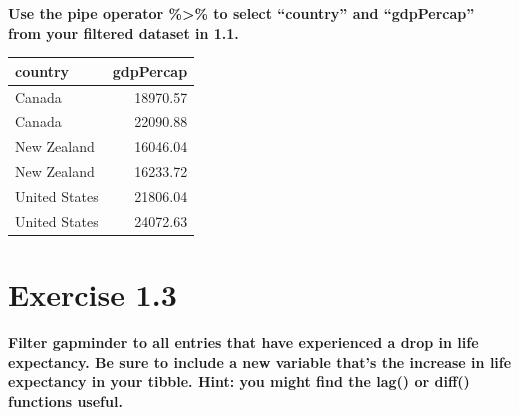 \documentclass[]{article}
\newenvironment{Shaded}{\begin{snugshade}}{\end{snugshade}}
\newcommand{\DataTypeTok}[1]{\textcolor[rgb]{0.13,0.29,0.53}{#1}}
\newcommand{\DecValTok}[1]{\textcolor[rgb]{0.00,0.00,0.81}{#1}}
\newcommand{\KeywordTok}[1]{\textcolor[rgb]{0.13,0.29,0.53}{\textbf{#1}}}
\newcommand{\NormalTok}[1]{#1}
\newcommand{\OperatorTok}[1]{\textcolor[rgb]{0.81,0.36,0.00}{\textbf{#1}}}
\newcommand{\StringTok}[1]{\textcolor[rgb]{0.31,0.60,0.02}{#1}}
\begin{document}
\textbf{Use the pipe operator \%\textgreater\% to select ``country'' and
``gdpPercap'' from your filtered dataset in 1.1.}

\begin{Shaded}
\end{Shaded}

\begin{longtable}[]{@{}lr@{}}
\toprule
country & gdpPercap\tabularnewline
\midrule
\endhead
Canada & 18970.57\tabularnewline
Canada & 22090.88\tabularnewline
New Zealand & 16046.04\tabularnewline
New Zealand & 16233.72\tabularnewline
United States & 21806.04\tabularnewline
United States & 24072.63\tabularnewline
\bottomrule
\end{longtable}

\hypertarget{exercise-1.3}{%
\section{Exercise 1.3}\label{exercise-1.3}}

\textbf{Filter gapminder to all entries that have experienced a drop in
life expectancy. Be sure to include a new variable that's the increase
in life expectancy in your tibble. Hint: you might find the lag() or
diff() functions useful.}

\begin{Shaded}
\end{Shaded}
\end{document}
